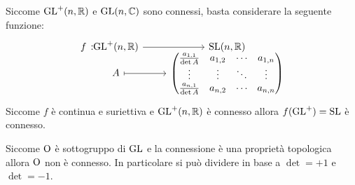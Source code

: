 \begin{corollary}
\end{corollary}
\begin{demonstration}
	Siccome $\operatorname{GL}^+(n,\mathbb{R})$ e $\operatorname{GL}(n,\mathbb{C})$ sono connessi, basta considerare la seguente funzione:
		\begin{gather*}
			\funztot f {\gl^+(n,\realset)} {\Sl(n,\realset)} A {
				\begin{pmatrix}
					\frac{a_{1,1}}{\det A} & a_{1,2} & \cdots  & a_{1,n} \\
					\vdots                 & \vdots  & \ddots  & \vdots \\
					\frac{a_{n,1}}{\det A} & a_{n,2} & \cdots  & a_{n,n}
				\end{pmatrix}
			}			
		\end{gather*}
	Siccome $f$ è continua e suriettiva e $\operatorname{GL}^+(n,\mathbb{R})$ è connesso allora $f(\operatorname{GL}^+)=\operatorname{SL}$ è connesso.
\end{demonstration}

\begin{corollary}
\end{corollary}
\begin{demonstration}
	Siccome $\operatorname{O}$ è sottogruppo di $\operatorname{GL}$ e la connessione è una proprietà topologica allora $\operatorname{O}$ non è connesso. In particolare si può dividere in base a $\det =+1$ e $\det =-1$.
\end{demonstration}

